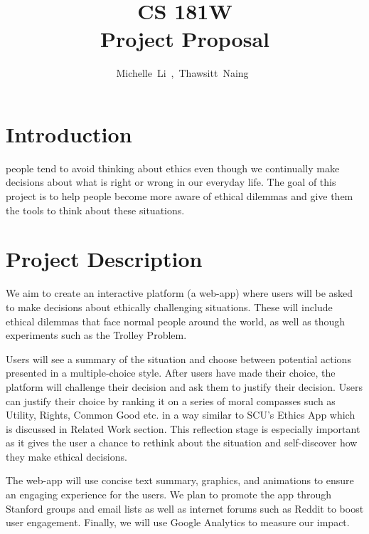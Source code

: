 \documentclass[12pt,journal,compsoc]{IEEEtran}
\begin{document}
\title{CS 181W \\ Project Proposal}

\author{Michelle~Li~,~Thawsitt~Naing~}


%
{}

\maketitle


\section{Introduction}

 people tend to avoid thinking about ethics even though we continually make decisions about what is right or wrong in our everyday life. The goal of this project is to help people become more aware of ethical dilemmas and give them the tools to think about these situations.


\section{Project Description}
We aim to create an interactive platform (a web-app) where users will be asked to make decisions about ethically challenging situations. These will include ethical dilemmas that face normal people around the world, as well as though experiments such as the Trolley Problem. 

Users will see a summary of the situation and choose between potential actions presented in a multiple-choice style. After users have made their choice, the platform will challenge their decision and ask them to justify their decision. Users can justify their choice by ranking it on a series of moral compasses such as Utility, Rights, Common Good etc. in a way similar to SCU’s Ethics App which is discussed in Related Work section. This reflection stage is especially important as it gives the user a chance to rethink about the situation and self-discover how they make ethical decisions.

The web-app will use concise text summary, graphics, and animations to ensure an engaging experience for the users. We plan to promote the app through Stanford groups and email lists as well as internet forums such as Reddit to boost user engagement. Finally, we will use Google Analytics to measure our impact.
\end{document}
